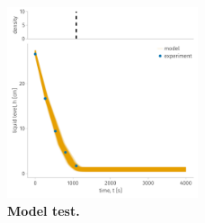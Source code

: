 \documentclass[openacc]{rsproca_new}%
\begin{document}
\begin{figure}[h!]
    \centering
    	\includegraphics[width=0.5\textwidth]{../test.pdf}
    \caption{
      \textbf{Model test.}
      } \label{fig:test}
\end{figure}
\end{document}
